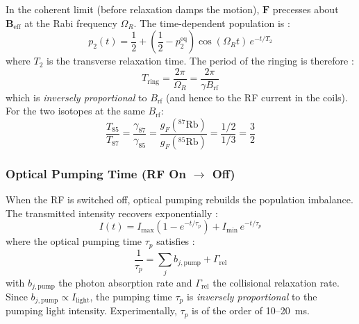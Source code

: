 In the coherent limit (before relaxation damps the motion), $\mathbf{F}$ precesses about
$\mathbf{B}_{\text{eff}}$ at the Rabi frequency $\Omega_R$. The time-dependent
population is :
\begin{equation}
    p_2(t) = \frac{1}{2} + \left(\frac{1}{2} - p_2^{\text{eq}}\right)\cos(\Omega_R t)\,e^{-t/T_2}
    \label{eq:rabi_osc}
\end{equation}
where $T_2$ is the transverse relaxation time. The period of the ringing is therefore :
\begin{equation}
    T_{\text{ring}} = \frac{2\pi}{\Omega_R} = \frac{2\pi}{\gamma B_{\text{rf}}}
    \label{eq:ring_period}
\end{equation}
which is \emph{inversely proportional} to $B_{\text{rf}}$ (and hence to the RF current
in the coils). For the two isotopes at the same $B_{\text{rf}}$:
\begin{equation}
    \frac{T_{85}}{T_{87}} = \frac{\gamma_{87}}{\gamma_{85}}
    = \frac{g_F(^{87}\text{Rb})}{g_F(^{85}\text{Rb})}
    = \frac{1/2}{1/3} = \frac{3}{2}
    \label{eq:period_ratio}
\end{equation}
 
\subsubsection*{Optical Pumping Time (RF On $\to$ Off)}
 
When the RF is switched off, optical pumping rebuilds the population imbalance. The
transmitted intensity recovers exponentially :
\begin{equation}
    I(t) = I_{\max}\left(1 - e^{-t/\tau_p}\right) + I_{\min}\,e^{-t/\tau_p}
    \label{eq:pump_recovery}
\end{equation}
where the optical pumping time $\tau_p$ satisfies :
\begin{equation}
    \frac{1}{\tau_p} = \sum_j b_{j,\text{pump}} + \Gamma_{\text{rel}}
    \label{eq:pump_time}
\end{equation}
with $b_{j,\text{pump}}$ the photon absorption rate and $\Gamma_{\text{rel}}$ the
collisional relaxation rate. Since $b_{j,\text{pump}} \propto I_{\text{light}}$, the
pumping time $\tau_p$ is \emph{inversely proportional} to the pumping light intensity.
Experimentally, $\tau_p$ is of the order of 10--20~ms.